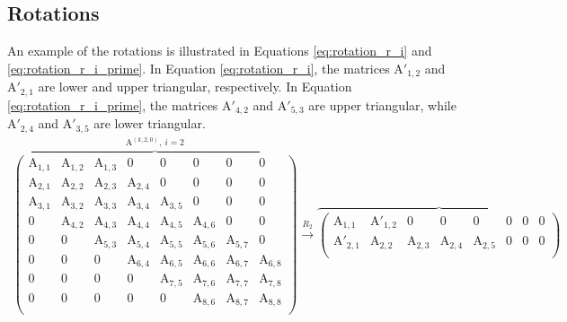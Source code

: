 \documentclass{article}
\newcommand\matA{\boldsymbol{\mathrm{A}}}
\begin{document}
\subsection{Rotations}
An example of the rotations is illustrated in Equations \eqref{eq:rotation_r_i} and \eqref{eq:rotation_r_i_prime}. In Equation \eqref{eq:rotation_r_i}, the matrices $\matA'_{1,2}$ and $\matA'_{2,1}$ are lower and upper triangular, respectively. In Equation \eqref{eq:rotation_r_i_prime}, the matrices $\matA'_{4,2}$ and $\matA'_{5,3}$ are upper triangular, while $\matA'_{2,4}$ and $\matA'_{3,5}$ are lower triangular. 
\begingroup
\setlength\arraycolsep{1.5pt}
\begin{align}
    \label{eq:rotation_r_i}
    \overbrace{
    \begin{pmatrix}
        \matA_{1,1}  & \matA_{1,2}  & \boxed{\matA_{1,3}}   & 0             & 0           & 0           & 0           & 0           \\
        \matA_{2,1}  & \matA_{2,2}  &\matA_{2,3}   & \matA_{2,4}   & 0           & 0           & 0           & 0           \\
        \boxed{\matA_{3,1}}  & \matA_{3,2}  &\matA_{3,3}   & \matA_{3,4}   & \matA_{3,5} & 0           & 0           & 0           \\
        0            & \matA_{4,2}  &\matA_{4,3}   & \matA_{4,4}   & \matA_{4,5} & \matA_{4,6} & 0           & 0           \\
        0            & 0            &\matA_{5,3}   & \matA_{5,4}   & \matA_{5,5} & \matA_{5,6} & \matA_{5,7} & 0           \\
        0            & 0            & 0            & \matA_{6,4}   & \matA_{6,5} & \matA_{6,6} & \matA_{6,7} & \matA_{6,8} \\
        0            & 0            & 0            & 0             & \matA_{7,5} & \matA_{7,6} & \matA_{7,7} & \matA_{7,8} \\
        0            & 0            & 0            & 0             & 0           & \matA_{8,6} & \matA_{8,7} & \matA_{8,8} \\
    \end{pmatrix}
    }^{
        \matA^{(k,2,0)},\ i=2
    }
    \stackrel{R_2}{\longrightarrow}
    \overbrace{
    \begin{pmatrix}
        \matA_{1,1}  & \matA'_{1,2}  & 0   & 0             & 0           & 0           & 0           & 0           \\
        \matA'_{2,1}  & \matA_{2,2}  &\matA_{2,3}   & \matA_{2,4}   & \boxed{\matA_{2,5}}           & 0           & 0           & 0           \\

\end{pmatrix}}
\end{align}
\end{document}
